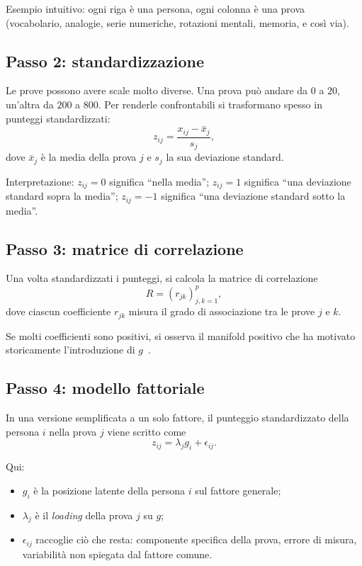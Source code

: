\documentclass[10pt, a4paper]{article}
\theoremstyle{plain}
\theoremstyle{definition}
\theoremstyle{remark}
\begin{document}
Esempio intuitivo: ogni riga è una persona, ogni colonna è una prova
(vocabolario, analogie, serie numeriche, rotazioni mentali, memoria, e così
via).

\subsection{Passo 2: standardizzazione}

Le prove possono avere scale molto diverse. Una prova può andare da $0$ a $20$,
un'altra da $200$ a $800$. Per renderle confrontabili si trasformano spesso in
punteggi standardizzati:
\begin{equation}
z_{ij}=\frac{x_{ij}-\bar{x}_j}{s_j},
\label{eq:zscore}
\end{equation}
dove $\bar{x}_j$ è la media della prova $j$ e $s_j$ la sua deviazione
standard.

Interpretazione: $z_{ij}=0$ significa ``nella media''; $z_{ij}=1$ significa
``una deviazione standard sopra la media''; $z_{ij}=-1$ significa ``una
deviazione standard sotto la media''.

\subsection{Passo 3: matrice di correlazione}

Una volta standardizzati i punteggi, si calcola la matrice di correlazione
\[
R=(r_{jk})_{j,k=1}^{p},
\]
dove ciascun coefficiente $r_{jk}$ misura il grado di associazione tra le prove
$j$ e $k$.

Se molti coefficienti sono positivi, si osserva il manifold positivo che ha
motivato storicamente l'introduzione di $g$~\cite{spearman1904}.

\subsection{Passo 4: modello fattoriale}

In una versione semplificata a un solo fattore, il punteggio standardizzato
della persona $i$ nella prova $j$ viene scritto come
\begin{equation}
z_{ij}=\lambda_j g_i + \epsilon_{ij}.
\label{eq:factor}
\end{equation}

Qui:
\begin{itemize}
    \item $g_i$ è la posizione latente della persona $i$ sul fattore generale;
    \item $\lambda_j$ è il \emph{loading} della prova $j$ su $g$;
    \item $\epsilon_{ij}$ raccoglie ciò che resta: componente specifica della
          prova, errore di misura, variabilità non spiegata dal fattore comune.
\end{itemize}
\end{document}
